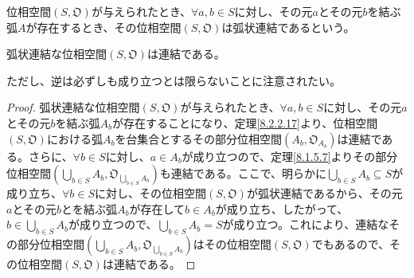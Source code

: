 \documentclass[dvipdfmx]{jsarticle}
\begin{document}
\begin{dfn}
位相空間$\left( S,\mathfrak{O} \right)$が与えられたとき、$\forall a,b \in S$に対し、その元$a$とその元$b$を結ぶ弧$A$が存在するとき、その位相空間$\left( S,\mathfrak{O} \right)$は弧状連結であるという。
\end{dfn}
\begin{thm}\label{8.2.2.19}
弧状連結な位相空間$\left( S,\mathfrak{O} \right)$は連結である。\par
ただし、逆は必ずしも成り立つとは限らないことに注意されたい。
\end{thm}
\begin{proof}
弧状連結な位相空間$\left( S,\mathfrak{O} \right)$が与えられたとき、$\forall a,b \in S$に対し、その元$a$とその元$b$を結ぶ弧$A_{b}$が存在することになり、定理\ref{8.2.2.17}より、位相空間$\left( S,\mathfrak{O} \right)$における弧$A_{b}$を台集合とするその部分位相空間$\left( A_{b},\mathfrak{O}_{A_{b}} \right)$は連結である。さらに、$\forall b \in S$に対し、$a \in A_{b}$が成り立つので、定理\ref{8.1.5.7}よりその部分位相空間$\left( \bigcup_{b \in S} A_{b},\mathfrak{O}_{\bigcup_{b \in S} A_{b}} \right)$も連結である。ここで、明らかに$\bigcup_{b \in S} A_{b} \subseteq S$が成り立ち、$\forall b \in S$に対し、その位相空間$\left( S,\mathfrak{O} \right)$が弧状連結であるから、その元$a$とその元$b$とを結ぶ弧$A_{b}$が存在して$b \in A_{b}$が成り立ち、したがって、$b \in \bigcup_{b \in S} A_{b}$が成り立つので、$\bigcup_{b \in S} A_{b} = S$が成り立つ。これにより、連結なその部分位相空間$\left( \bigcup_{b \in S} A_{b},\mathfrak{O}_{\bigcup_{b \in S} A_{b}} \right)$はその位相空間$\left( S,\mathfrak{O} \right)$でもあるので、その位相空間$\left( S,\mathfrak{O} \right)$は連結である。
\end{proof}
\end{document}
